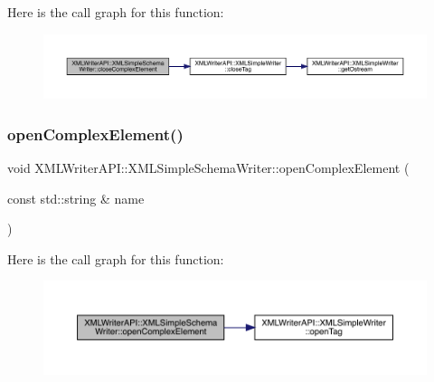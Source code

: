 Here is the call graph for this function\+:
\nopagebreak
\begin{figure}[H]
\begin{center}
\leavevmode
\includegraphics[width=350pt]{db/d0b/classXMLWriterAPI_1_1XMLSimpleSchemaWriter_a48be6d4cbc08f03e9e76fa94107c4b8a_cgraph}
\end{center}
\end{figure}
\mbox{\label{classXMLWriterAPI_1_1XMLSimpleSchemaWriter_a136a57c1860b0baa0fd6b877f4dce4bc}} 
\subsubsection{\texorpdfstring{openComplexElement()}{openComplexElement()}\hspace{0.1cm}{\footnotesize\ttfamily [1/2]}}
{\footnotesize\ttfamily void X\+M\+L\+Writer\+A\+P\+I\+::\+X\+M\+L\+Simple\+Schema\+Writer\+::open\+Complex\+Element (\begin{DoxyParamCaption}\item[{const std\+::string \&}]{name }\end{DoxyParamCaption})\hspace{0.3cm}{\ttfamily [inline]}}

Here is the call graph for this function\+:
\nopagebreak
\begin{figure}[H]
\begin{center}
\leavevmode
\includegraphics[width=350pt]{db/d0b/classXMLWriterAPI_1_1XMLSimpleSchemaWriter_a136a57c1860b0baa0fd6b877f4dce4bc_cgraph}
\end{center}
\end{figure}
\mbox{\label{classXMLWriterAPI_1_1XMLSimpleSchemaWriter_a136a57c1860b0baa0fd6b877f4dce4bc}} 
